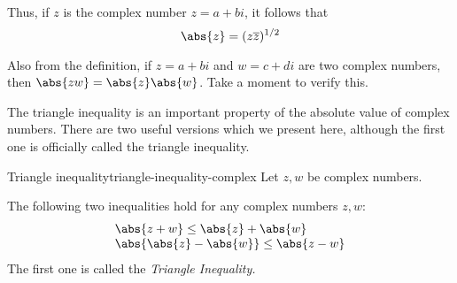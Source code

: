 Thus, if $z$ is the complex number $z=a+bi$, it follows that
\begin{equation*}
  \abs{z} =(z\overline{z}) ^{1/2}
\end{equation*}

Also from the definition, if $z=a+bi$ and $w=c+di$ are two complex numbers,
then $\abs{zw}=\abs{z}\abs{w}$. Take a moment to verify this.

The triangle inequality is an important property of the absolute value
of complex numbers. There are two useful versions which we present
here, although the first one is officially called the triangle inequality. 

\begin{proposition}{Triangle inequality}{triangle-inequality-complex}
  Let $z,w$ be complex numbers. 

  The following two inequalities hold for any  complex numbers $z,w$:
  \begin{equation*}
    \begin{array}{l}
      \abs{z+w} \leq \abs{z} +\abs{w}  \\
      \abs{\abs{z} -\abs{w}} \leq \abs{z-w} 
    \end{array}
  \end{equation*}
  The first one is called the \em{Triangle Inequality}.
\end{proposition}

